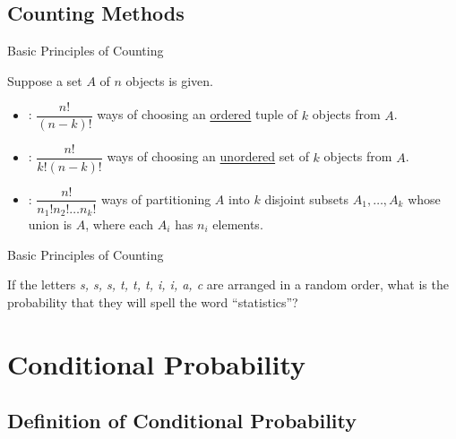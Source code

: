 \subsection{Counting Methods}

\begin{frame}{Basic Principles of Counting}

Suppose a set $A$ of $n$ objects is given.
\begin{itemize}
	\justifying
	\item {}: $\dfrac{n!}{(n-k)!}$ ways of choosing an \underline{ordered} tuple of $k$ objects from $A$.
	\item {}: $\dfrac{n!}{k!(n-k)!}$ ways of choosing an \underline{unordered} set of $k$ objects from $A$.
	\item {}: $\dfrac{n!}{n_1!n_2!\ldots n_k!}$ ways of partitioning $A$ into $k$ disjoint subsets $A_1, \ldots, A_k$ whose union is $A$, where each $A_i$ has $n_i$ elements.
\end{itemize}

\end{frame}

\begin{frame}{Basic Principles of Counting}

\justifying
{} If the letters \emph{s, s, s, t, t, t, i, i, a, c} are arranged in a random order, what is the probability that they will spell the word ``statistics''?


\end{frame}

\section{Conditional Probability}

\subsection{Definition of Conditional Probability}

